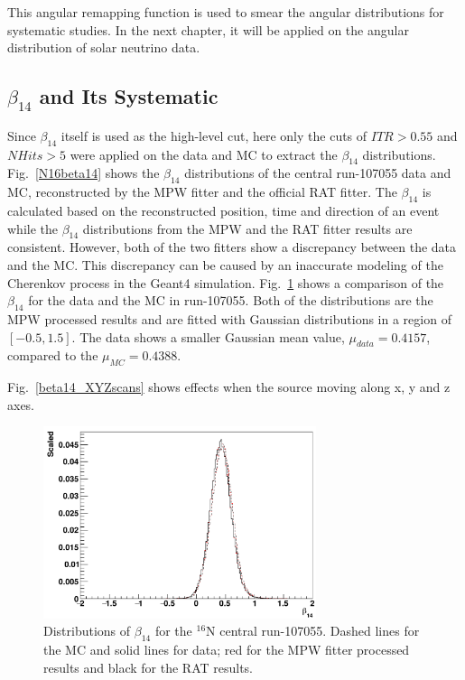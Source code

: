 This angular remapping function is used to smear the angular distributions for systematic studies. In the next chapter, it will be applied on the angular distribution of solar neutrino data. 

\subsection{$\beta_{14}$ and Its Systematic}
Since $\beta_{14}$ itself is used as the high-level cut, here only the cuts of $ITR>0.55$ and $NHits>5$ were applied on the data and MC to extract the $\beta_{14}$ distributions.
Fig.~\ref{N16beta14} shows the $\beta_{14}$ distributions of the central run-107055 data and MC, reconstructed by the MPW fitter and the official RAT fitter. The $\beta_{14}$ is calculated based on the reconstructed position, time and direction of an event while the $\beta_{14}$ distributions from the MPW and the RAT fitter results are consistent. However, both of the two fitters show a discrepancy between the data and the MC. This discrepancy can be caused by an inaccurate modeling of the Cherenkov process in the Geant4 simulation\cite{dunmore2004separation,beta14discrepancy}.
Fig.~\ref{N16beta14_cmp} shows a comparison of the $\beta_{14}$ for the data and the MC in run-107055. Both of the distributions are the MPW processed results and are fitted with Gaussian distributions in a region of $[-0.5,1.5]$. The data shows a smaller Gaussian mean value, $\mu_{data}=0.4157$, compared to the $\mu_{MC}=0.4388$.

Fig.~\ref{beta14_XYZscans} shows effects when the source moving along x, y and z axes.

\begin{figure}[htbp]
	\centering
	\includegraphics[width=8cm]{N16_beta14_107055.png}
	\caption{Distributions of $\beta_{14}$ for the $^{16}$N central run-107055. Dashed lines for the MC and solid lines for data; red for the MPW fitter processed results and black for the RAT results.}
	\label{N16beta14_cmp}
\end{figure}

